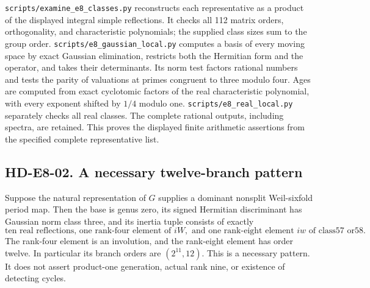 \texttt{scripts/examine\_e8\_classes.py} reconstructs each representative
as a product of the displayed integral simple reflections. It checks
all 112 matrix orders, orthogonality, and characteristic polynomials;
the supplied class sizes sum to the group order.
\texttt{scripts/e8\_gaussian\_local.py} computes a basis of every
moving space by exact Gaussian elimination, restricts both the
Hermitian form and the operator, and takes their determinants.
Its norm test factors rational numbers and tests the parity of
valuations at primes congruent to three modulo four. Ages are
computed from exact cyclotomic factors of the real characteristic
polynomial, with every exponent shifted by $1/4$ modulo one.
\texttt{scripts/e8\_real\_local.py} separately checks all real classes.
The complete rational outputs, including spectra, are retained.
This proves the displayed finite arithmetic assertions from the
specified complete representative list.

\subsection*{HD-E8-02. A necessary twelve-branch pattern}
Suppose the natural representation of $G$ supplies a dominant
nonsplit Weil-sixfold period map. Then the base is genus zero,
its signed Hermitian discriminant has Gaussian norm class three,
and its inertia tuple consists of exactly
\[
 \boxed{\text{ten real reflections, one rank-four element of }iW,
        \text{ and one rank-eight element }iw\text{ of class57 or58}.}
\]
The rank-four element is an involution, and the rank-eight element
has order twelve. In particular its branch orders are $(2^{11},12)$.
This is a necessary pattern. It does not assert product-one
generation, actual rank nine, or existence of detecting cycles.

